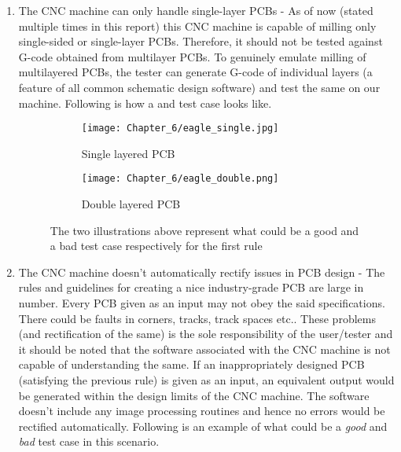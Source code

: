 \begin{enumerate}
 \item The CNC machine can only handle single-layer PCBs - As of now (stated multiple times in this report) this CNC machine is capable of milling only single-sided or single-layer PCBs. Therefore, it should not be tested against G-code obtained from multilayer PCBs. To genuinely emulate milling of multilayered PCBs, the tester can generate G-code of individual layers (a feature of all common schematic design software) and test the same on our machine. Following is how a  and  test case looks like.

       \begin{figure}[h]

        \begin{subfigure}{0.5\textwidth}
         \hspace{8mm}
         \texttt{[image: Chapter\_6/eagle\_single.jpg]}
         \caption{Single layered PCB}
         \label{fig:slpcb}
        \end{subfigure}
        \begin{subfigure}{0.5\textwidth}
         \hspace{8mm}
         \texttt{[image: Chapter\_6/eagle\_double.png]}
         \caption{Double layered PCB}
         \label{fig:dlpcb}
        \end{subfigure}

        \caption{The two illustrations above represent what could be a good and a bad test case respectively for the first rule}
        \label{fig:sl_dl_pcb}
       \end{figure}

 \item The CNC machine doesn’t automatically rectify issues in PCB design - The rules and guidelines for creating a nice industry-grade PCB are large in number. Every PCB given as an input may not obey the said specifications. There could be faults in corners, tracks, track spaces etc.. These problems (and rectification of the same) is the sole responsibility of the user/tester and it should be noted that the software associated with the CNC machine is not capable of understanding the same. If an inappropriately designed PCB (satisfying the previous rule) is given as an input, an equivalent output would be generated within the design limits of the CNC machine. The software doesn’t include any image processing routines and hence no errors would be rectified automatically. Following is an example of what could be a \textit{good} and \textit{bad} test case in this scenario.


\end{enumerate}
